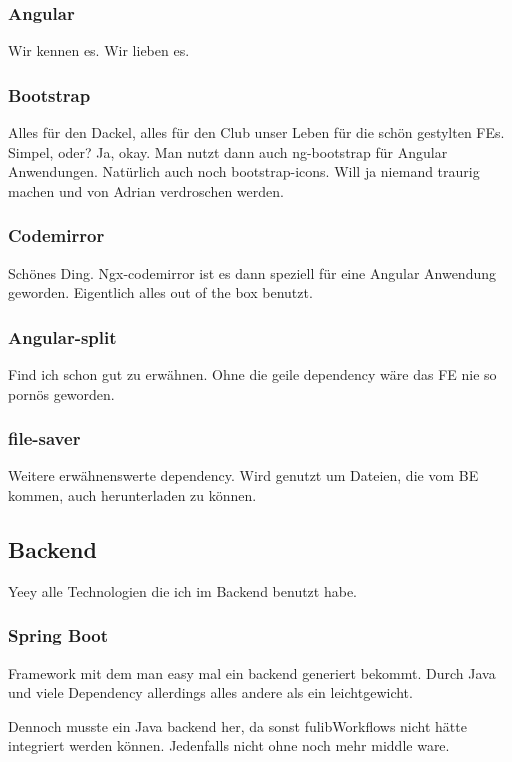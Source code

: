 \subsubsection{Angular}
Wir kennen es.
Wir lieben es.

\subsubsection{Bootstrap}
Alles für den Dackel, alles für den Club unser Leben für die schön gestylten FEs.
Simpel, oder?
Ja, okay.
Man nutzt dann auch ng-bootstrap für Angular Anwendungen.
Natürlich auch noch bootstrap-icons.
Will ja niemand traurig machen und von Adrian verdroschen werden.

\subsubsection{Codemirror}
Schönes Ding.
Ngx-codemirror ist es dann speziell für eine Angular Anwendung geworden.
Eigentlich alles out of the box benutzt.

\subsubsection{Angular-split}
Find ich schon gut zu erwähnen.
Ohne die geile dependency wäre das FE nie so pornös geworden.

\subsubsection{file-saver}
Weitere erwähnenswerte dependency.
Wird genutzt um Dateien, die vom BE kommen, auch herunterladen zu können.

\subsection{Backend}\label{subsec:backend}
Yeey alle Technologien die ich im Backend benutzt habe.

\subsubsection{Spring Boot}
Framework mit dem man easy mal ein backend generiert bekommt.
Durch Java und viele Dependency allerdings alles andere als ein leichtgewicht.

Dennoch musste ein Java backend her, da sonst fulibWorkflows nicht hätte integriert werden können.
Jedenfalls nicht ohne noch mehr middle ware.

